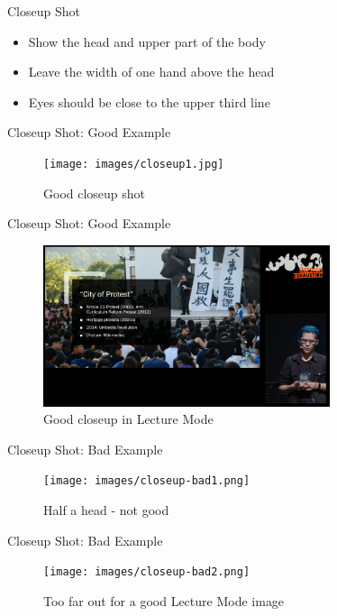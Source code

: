 
\begin{frame}{Closeup Shot}
	\begin{itemize}
		\item Show the head and upper part of the body
		\item Leave the width of one hand above the head
		\item Eyes should be close to the upper third line
	\end{itemize}
\end{frame}

\begin{frame}{Closeup Shot: Good Example}
	\begin{figure}
		\centering
		\texttt{[image: images/closeup1.jpg]}
		\caption{Good closeup shot}
	\end{figure}
\end{frame}

\begin{frame}{Closeup Shot: Good Example}
	\begin{figure}
		\centering
		\includegraphics[width=0.75\textwidth]{images/closeup2.jpg}
		\caption{Good closeup in Lecture Mode}
	\end{figure}
\end{frame}

\begin{frame}{Closeup Shot: Bad Example}
	\begin{figure}
		\centering
		\texttt{[image: images/closeup-bad1.png]}
		\caption{Half a head - not good}
	\end{figure}
\end{frame}

\begin{frame}{Closeup Shot: Bad Example}
	\begin{figure}
		\centering
		\texttt{[image: images/closeup-bad2.png]}
		\caption{Too far out for a good Lecture Mode image}
	\end{figure}
\end{frame}


